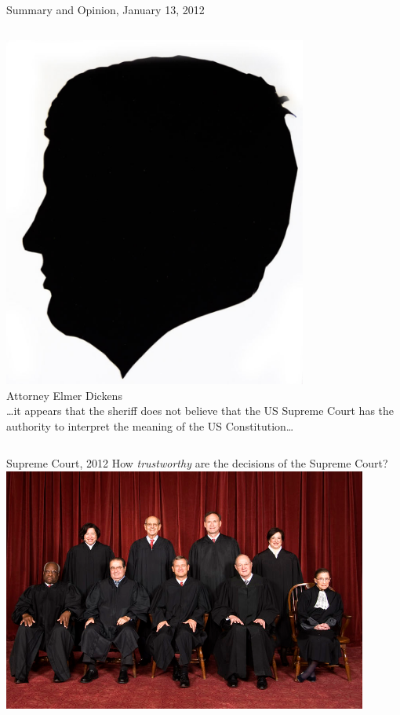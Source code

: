 \begin{frame}{Summary and Opinion, January 13, 2012}
    \begin{columns}[onlytextwidth]
            \centering
            \includegraphics[width=0.75\textwidth]{img/elmer-dickens.png}
            \\ Attorney Elmer Dickens \\
\ldots it appears that the sheriff  does not believe that the US Supreme Court has the authority to interpret the meaning of the US Constitution\ldots
    \end{columns}
\end{frame}

\begin{frame}{Supreme Court, 2012}
    \centering
    {\LARGE How \emph{trustworthy} are the decisions of the Supreme Court? } \\
    \includegraphics[width=0.9\textwidth]{img/supreme.png} \\
\end{frame}

